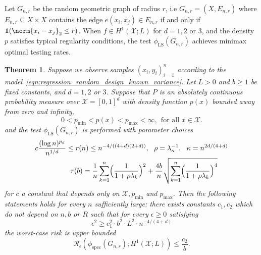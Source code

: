 \documentclass{article}
\newcommand{\1}{\mathbf{1}}
\newcommand{\Xset}{\mathcal{X}}
\newcommand{\LS}{\mathrm{LS}}
\theoremstyle{alden}
\theoremstyle{aldenthm}
\newtheorem{theorem}{Theorem}
\theoremstyle{definition}
\theoremstyle{remark}
\begin{document}
Let $G_{n,r}$ be the random geometric graph of radius $r$, i.e $G_{n,r} = (X,E_{n,r})$ where $E_{n,r} \subseteq X \times X$ contains the edge $e(x_i,x_j) \in E_{n,r}$ if and only if $\1(\norm{x_i - x_j}_2 \leq r)$. When $f \in H^1(\mathcal{X};L)$ for $d = 1,2$ or $3$, and the density $p$ satisfies typical regularity conditions, the test $\phi_{\LS}(G_{n,r})$ achieves minimax optimal testing rates.
\begin{theorem}
	\label{thm:sobolev_testing_rate_laplacian_smoothing_order1}
	Suppose we observe samples $(x_i,y_i)_{i = 1}^{n}$ according to the model~\eqref{eqn:regression_random_design_known_variance}. Let $L > 0$ and $b \geq 1$ be fixed constants, and $d = 1,2$ or $3$. Suppose that $P$ is an absolutely continuous probability measure over $\mathcal{X} = [0,1]^d$ with density function $p(x)$ bounded away from zero and infinity, 
	\begin{equation*}
	0 < p_{\min} < p(x) < p_{\max} < \infty,~~ \textrm{for all $x \in \mathcal{X}$.}
	\end{equation*}
	and the test $\phi_{\LS}(G_{n,r})$ is performed with parameter choices
	\begin{align*}
	c \frac{(\log n)^{p_d}}{n^{1/d}} \leq r(n) \leq n^{-4/((4 + d)(2+d))}& ,~~ \rho = \lambda_{\kappa}^{-1},~~ \kappa = n^{2d/(4 + d)}\\
	\tau(b) = \frac{1}{n} \sum_{k = 1}^{n} \Bigl(\frac{1}{1 + \rho \lambda_k}\Bigr)^2 & + \frac{4b}{n}\sqrt{\sum_{k = 1}^{n} \Bigl(\frac{1}{1 + \rho \lambda_k}\Bigr)^4}
	\end{align*}
	for $c$ a constant that depends only on $\Xset, p_{\min}$ and $p_{\max}$. Then the following statements holds for every $n$ sufficiently large: there exists constants $c_1,c_2$ which do not depend on $n,b$ or $R$ such that for every $\epsilon \geq 0$ satisfying
	\begin{equation}
	\label{eqn:sobolev_testing_rate_order1}
	\epsilon^2 \geq c_1^2 \cdot b^2 \cdot L^2 \cdot n^{-4/(4 + d)}
	\end{equation}
	the worst-case risk is upper bounded
	\begin{equation}
	\label{eqn:sobolev_testing_rate_order1_1}
	\mathcal{R}_{\epsilon}(\phi_{\mathrm{spec}}(G_{n,r}); H^1(\mathcal{X};L)) \leq \frac{c_2}{b}.
	\end{equation}
\end{theorem}
\end{document}
